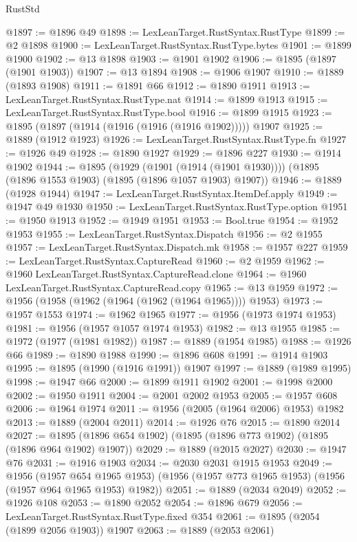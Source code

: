 \begin{lexlean}{RustStd}
\begin{coremodule}
@1897 := @1896 @49
@1898 := LexLeanTarget.RustSyntax.RustType
@1899 := @2 @1898
@1900 := LexLeanTarget.RustSyntax.RustType.bytes
@1901 := @1899 @1900
@1902 := @13 @1898
@1903 := @1901 @1902
@1906 := @1895 (@1897 (@1901 @1903))
@1907 := @13 @1894
@1908 := @1906 @1907
@1910 := @1889 (@1893 @1908)
@1911 := @1891 @66
@1912 := @1890 @1911
@1913 := LexLeanTarget.RustSyntax.RustType.nat
@1914 := @1899 @1913
@1915 := LexLeanTarget.RustSyntax.RustType.bool
@1916 := @1899 @1915
@1923 := @1895 (@1897 (@1914 (@1916 (@1916 (@1916 @1902))))) @1907
@1925 := @1889 (@1912 @1923)
@1926 := LexLeanTarget.RustSyntax.RustType.fn
@1927 := @1926 @49
@1928 := @1890 @1927
@1929 := @1896 @227
@1930 := @1914 @1902
@1944 := @1895
    (@1929 (@1901 (@1914 (@1901 @1930))))
    (@1895 (@1896 @1553 @1903) (@1895 (@1896 @1057 @1903) @1907))
@1946 := @1889 (@1928 @1944)
@1947 := LexLeanTarget.RustSyntax.ItemDef.apply
@1949 := @1947 @49 @1930
@1950 := LexLeanTarget.RustSyntax.RustType.option
@1951 := @1950 @1913
@1952 := @1949 @1951
@1953 := Bool.true
@1954 := @1952 @1953
@1955 := LexLeanTarget.RustSyntax.Dispatch
@1956 := @2 @1955
@1957 := LexLeanTarget.RustSyntax.Dispatch.mk
@1958 := @1957 @227
@1959 := LexLeanTarget.RustSyntax.CaptureRead
@1960 := @2 @1959
@1962 := @1960 LexLeanTarget.RustSyntax.CaptureRead.clone
@1964 := @1960 LexLeanTarget.RustSyntax.CaptureRead.copy
@1965 := @13 @1959
@1972 := @1956 (@1958 (@1962 (@1964 (@1962 (@1964 @1965)))) @1953)
@1973 := @1957 @1553
@1974 := @1962 @1965
@1977 := @1956 (@1973 @1974 @1953)
@1981 := @1956 (@1957 @1057 @1974 @1953)
@1982 := @13 @1955
@1985 := @1972 (@1977 (@1981 @1982))
@1987 := @1889 (@1954 @1985)
@1988 := @1926 @66
@1989 := @1890 @1988
@1990 := @1896 @608
@1991 := @1914 @1903
@1995 := @1895 (@1990 (@1916 @1991)) @1907
@1997 := @1889 (@1989 @1995)
@1998 := @1947 @66
@2000 := @1899 @1911 @1902
@2001 := @1998 @2000
@2002 := @1950 @1911
@2004 := @2001 @2002 @1953
@2005 := @1957 @608
@2006 := @1964 @1974
@2011 := @1956 (@2005 (@1964 @2006) @1953) @1982
@2013 := @1889 (@2004 @2011)
@2014 := @1926 @76
@2015 := @1890 @2014
@2027 := @1895 (@1896 @654 @1902) (@1895 (@1896 @773 @1902) (@1895 (@1896 @964 @1902) @1907))
@2029 := @1889 (@2015 @2027)
@2030 := @1947 @76
@2031 := @1916 @1903
@2034 := @2030 @2031 @1915 @1953
@2049 := @1956
    (@1957 @654 @1965 @1953)
    (@1956 (@1957 @773 @1965 @1953) (@1956 (@1957 @964 @1965 @1953) @1982))
@2051 := @1889 (@2034 @2049)
@2052 := @1926 @108
@2053 := @1890 @2052
@2054 := @1896 @679
@2056 := LexLeanTarget.RustSyntax.RustType.fixed @354
@2061 := @1895 (@2054 (@1899 @2056 @1903)) @1907
@2063 := @1889 (@2053 @2061)

\end{coremodule}
\end{lexlean}
